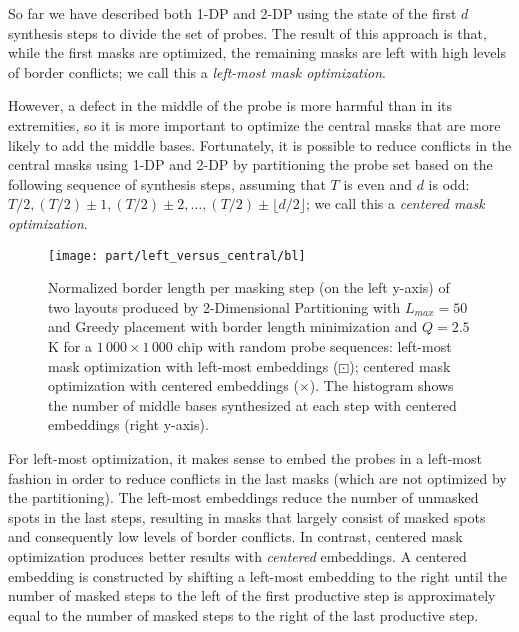 So far we have described both 1-DP and 2-DP using the state of the first $d$
synthesis steps to divide the set of probes. The result of this approach is
that, while the first masks are optimized, the remaining masks are left with
high levels of border conflicts; we call this a \emph{left-most mask
optimization}.

However, a defect in the middle of the probe is more harmful than in its
extremities, so it is more important to optimize the central masks that are more
likely to add the middle bases. Fortunately, it is possible to reduce conflicts
in the central masks using 1-DP and 2-DP by partitioning the probe set based on
the following sequence of synthesis steps, assuming that $T$ is even and $d$ is
odd:
$T/2, (T/2)\pm 1, (T/2)\pm 2, \dots, (T/2)\pm\lfloor d/2\rfloor$; we call this a
\emph{centered mask optimization}.

\begin{figure}[t]\centering
\texttt{[image: part/left\_versus\_central/bl]}
\caption{\label{fig:2d_left_center}
  Normalized border length per masking step (on the left y-axis) of two layouts
  produced by 2-Dimensional Partitioning with $L_{max}=50$ and Greedy placement
  with border length minimization and $Q=2.5$K for a $1\,000 \times 1\,000$ chip
  with random probe sequences: left-most mask optimization with left-most
  embeddings ({\tiny $\boxdot$}); centered mask optimization with centered
  embeddings ({\scriptsize $\times$}). The histogram shows the number of middle
  bases synthesized at each step with centered embeddings (right y-axis).}
\end{figure}

For left-most optimization, it makes sense to embed the probes in a left-most
fashion in order to reduce conflicts in the last masks (which are not optimized
by the partitioning). The left-most embeddings reduce the number of unmasked
spots in the last steps, resulting in masks that largely consist of masked
spots and consequently low levels of border conflicts. In contrast, centered
mask optimization produces better results with \emph{centered} embeddings. A
centered embedding is constructed by shifting a left-most embedding to the right
until the number of masked steps to the left of the first productive step is
approximately equal to the number of masked steps to the right of the last
productive step.


